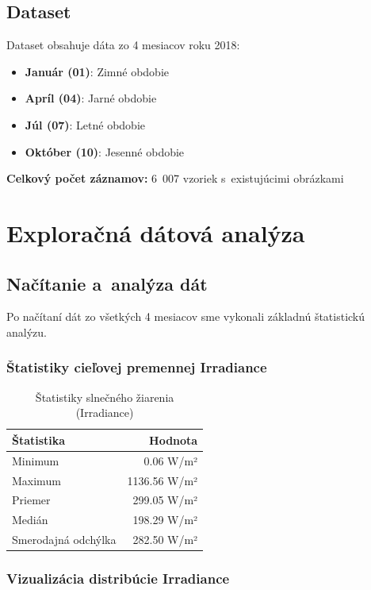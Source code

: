 \documentclass[a4paper, 12pt]{article}
\begin{document}
\subsection{Dataset}

Dataset obsahuje dáta zo 4 mesiacov roku 2018:
\begin{itemize}
    \item \textbf{Január (01)}: Zimné obdobie
    \item \textbf{Apríl (04)}: Jarné obdobie
    \item \textbf{Júl (07)}: Letné obdobie
    \item \textbf{Október (10)}: Jesenné obdobie
\end{itemize}

\textbf{Celkový počet záznamov:} 6~007 vzoriek s~existujúcimi obrázkami

\clearpage

\section{Exploračná dátová analýza}

\subsection{Načítanie a~analýza dát}

Po načítaní dát zo všetkých 4 mesiacov sme vykonali základnú štatistickú analýzu.

\subsubsection{Štatistiky cieľovej premennej Irradiance}

\begin{table}[H]
\centering
\begin{tabular}{lr}
\toprule
\textbf{Štatistika} & \textbf{Hodnota} \\
\midrule
Minimum & 0.06 W/m² \\
Maximum & 1136.56 W/m² \\
Priemer & 299.05 W/m² \\
Medián & 198.29 W/m² \\
Smerodajná odchýlka & 282.50 W/m² \\
\bottomrule
\end{tabular}
\caption{Štatistiky slnečného žiarenia (Irradiance)}
\end{table}

\subsubsection{Vizualizácia distribúcie Irradiance}
\end{document}
